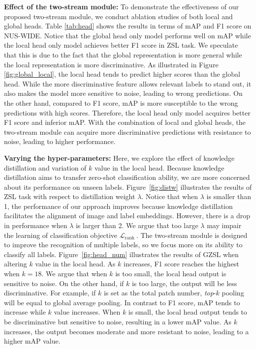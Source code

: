 \documentclass[letterpaper]{article} %
\begin{document}
\noindent\textbf{Effect of the two-stream module:}
To demonstrate the effectiveness of our proposed two-stream module, we conduct ablation studies of both local and global heads.
Table \ref{tab:head} shows the results in terms of mAP and F1 score on NUS-WIDE.
Notice that the global head only model performs well on mAP while the local head only model achieves better F1 score in ZSL task.
We speculate that this is due to the fact that the global representation is more general while the local representation is more discriminative.
As illustrated in Figure \ref{fig:global_local}, the local head tends to predict higher scores than the global head.
While the more discriminative feature allows relevant labels to stand out, it also makes the model more sensitive to noise, leading to wrong predictions.
On the other hand, compared to F1 score, mAP is more susceptible to the wrong predictions with high scores.
Therefore, the local head only model acquires better F1 score and inferior mAP.
With the combination of local and global heads, the two-stream module can acquire more discriminative predictions with resistance to noise, leading to higher performance.


\noindent\textbf{Varying the hyper-parameters:}
Here, we explore the effect of knowledge distillation and variation of $k$ value in the local head.
Because knowledge distillation aims to transfer zero-shot classification ability, we are more concerned about its performance on unseen labels.
Figure~\ref{fig:distw} illustrates the results of ZSL task with respect to distillation weight $\lambda$.
Notice that when $\lambda$ is smaller than 1, the performance of our approach improves because knowledge distillation facilitates the alignment of image and label embeddings.
However, there is a drop in performance when $\lambda$ is larger than 2.
We argue that too large $\lambda$ may impair the learning of classification objective $\mathcal{L}_{\text {rank }}$.
The two-stream module is designed to improve the recognition of multiple labels, so we focus more on its ability to classify all labels.
Figure~\ref{fig:head_num} illustrates the results of GZSL when altering $k$ value in the local head.
As $k$ increases, F1 score reaches the highest when $k {=} 18$.
We argue that when $k$ is too small, the local head output is sensitive to noise.
On the other hand, if $k$ is too large, the output will be less discriminative.
For example, if $k$ is set as the total patch number, \textit{top}-$k$ pooling will be equal to global average pooling.
In contrast to F1 score, mAP tends to increase while $k$ value increases.
When $k$ is small, the local head output tends to be discriminative but sensitive to noise, resulting in a lower mAP value.
As $k$ increases, the output becomes moderate and more resistant to noise, leading to a higher mAP value.

\end{document}
